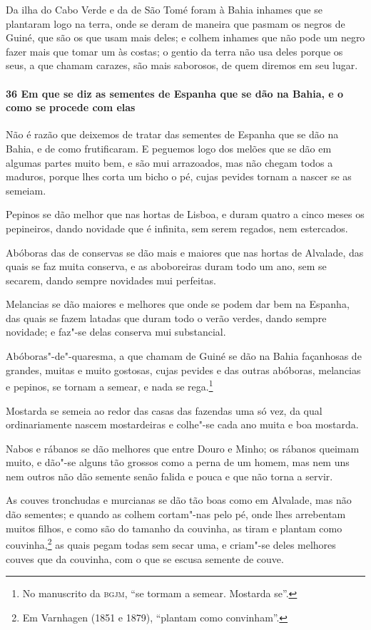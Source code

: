 \begin{linenumbers}
Da ilha do Cabo Verde e da de São Tomé foram à Bahia inhames que se plantaram logo na
terra, onde se deram de maneira que pasmam os negros de Guiné, que são os que usam mais
deles; e colhem inhames que não pode um negro fazer mais que tomar um às costas; o gentio
da terra não usa deles porque os seus, a que chamam carazes, são mais saborosos, de quem
diremos em seu lugar.

\paragraph{36 Em que se diz as sementes de Espanha que se dão na Bahia, e o como se
procede com elas}\quad
Não é razão que deixemos de tratar das sementes de Espanha que se dão na Bahia, e de como
frutificaram. E peguemos logo dos melões que se dão em algumas partes muito bem, e são mui
arrazoados, mas não chegam todos a maduros, porque lhes corta um bicho o pé, cujas pevides
tornam a nascer se as semeiam.

Pepinos se dão melhor que nas hortas de Lisboa, e duram quatro a cinco meses os
pepineiros, dando novidade que é infinita, sem serem regados, nem estercados.

Abóboras das de conservas se dão mais e maiores que nas hortas de Alvalade, das quais se
faz muita conserva, e as aboboreiras duram todo um ano, sem se secarem, dando sempre
novidades mui perfeitas.

Melancias se dão maiores e melhores que onde se podem dar bem na Espanha, das quais se
fazem latadas que duram todo o verão verdes, dando sempre novidade; e faz"-se delas
conserva mui substancial.

Abóboras"-de"-quaresma, a que chamam de Guiné se dão na Bahia façanhosas de grandes, muitas
e muito gostosas, cujas pevides e das outras abóboras, melancias e pepinos, se tornam a
semear, e nada se rega.\footnote{ No manuscrito da \textsc{bgjm}, ``se tormam a semear.
Mostarda se''.}

Mostarda se semeia ao redor das casas das fazendas uma só vez, da qual ordinariamente
nascem mostardeiras e colhe"-se cada ano muita e boa mostarda.

Nabos e rábanos se dão melhores que entre Douro e Minho; os rábanos queimam muito, e
dão"-se alguns tão grossos como a perna de um homem, mas nem uns nem outros não dão semente
senão falida e pouca e que não torna a servir.

As couves tronchudas e murcianas se dão tão boas como em Alvalade, mas não dão sementes; e
quando as colhem cortam"-nas pelo pé, onde lhes arrebentam muitos filhos, e como são do
tamanho da couvinha, as tiram e plantam como couvinha,\footnote{ Em Varnhagen (1851 e
1879), ``plantam como convinham''.} as quais pegam todas sem secar uma, e criam"-se deles
melhores couves que da couvinha, com o que se escusa semente de couve.


\end{linenumbers}
